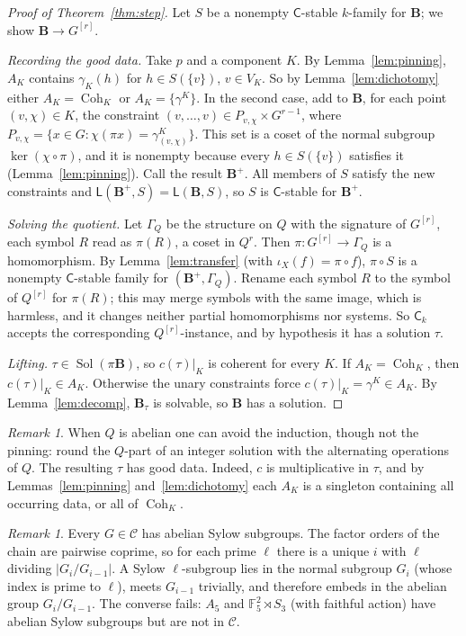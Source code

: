\documentclass[11pt]{article}
\theoremstyle{definition}
\theoremstyle{remark}
\newtheorem{remark}[theorem]{Remark}
\newcommand{\Coh}{\mathsf{C}}
\newcommand{\Sol}{\operatorname{Sol}}
\newcommand{\Cohset}{\operatorname{Coh}}
\begin{document}
\begin{proof}[Proof of Theorem~\ref{thm:step}]
Let $S$ be a nonempty $\Coh$-stable $k$-family for $\mathbf B$; we show
$\mathbf B\to G^{[r]}$.

\emph{Recording the good data.} Take $p$ and a component $K$. By
Lemma~\ref{lem:pinning}, $A_K$ contains $\gamma_K(h)$ for $h\in S(\{v\})$,
$v\in V_K$. So by Lemma~\ref{lem:dichotomy} either $A_K=\Cohset_K$ or
$A_K=\{\gamma^K\}$. In the second case, add to $\mathbf B$, for each point
$(v,\chi)\in K$, the constraint $(v,\dots,v)\in P_{v,\chi}\times G^{r-1}$,
where $P_{v,\chi}=\{x\in G:\chi(\pi x)=\gamma^K_{(v,\chi)}\}$. This set is a coset
of the normal subgroup $\ker(\chi\circ\pi)$, and it is nonempty because every
$h\in S(\{v\})$ satisfies it (Lemma~\ref{lem:pinning}). Call the result
$\mathbf B^+$. All members of $S$ satisfy the new constraints and
$\mathsf L(\mathbf B^+,S)=\mathsf L(\mathbf B,S)$, so $S$ is $\Coh$-stable for
$\mathbf B^+$.

\emph{Solving the quotient.} Let $\Gamma_Q$ be the structure on $Q$ with the
signature of $G^{[r]}$, each symbol $R$ read as $\pi(R)$, a coset in $Q^r$. Then
$\pi\colon G^{[r]}\to\Gamma_Q$ is a homomorphism. By Lemma~\ref{lem:transfer}
(with $\iota_X(f)=\pi\circ f$), $\pi\circ S$ is a nonempty $\Coh$-stable family
for $(\mathbf B^+,\Gamma_Q)$. Rename each symbol $R$ to the symbol of $Q^{[r]}$
for $\pi(R)$; this may merge symbols with the same image, which is harmless, and
it changes neither partial homomorphisms nor systems. So $\Coh_k$ accepts the
corresponding $Q^{[r]}$-instance, and by hypothesis it has a solution $\tau$.

\emph{Lifting.} $\tau\in\Sol(\pi\mathbf B)$, so $c(\tau)|_K$ is coherent for
every $K$. If $A_K=\Cohset_K$, then $c(\tau)|_K\in A_K$. Otherwise the unary
constraints force $c(\tau)|_K=\gamma^K\in A_K$. By Lemma~\ref{lem:decomp},
$\mathbf B_\tau$ is solvable, so $\mathbf B$ has a solution.
\end{proof}

\begin{remark}
When $Q$ is abelian one can avoid the induction, though not the pinning: round
the $Q$-part of an integer solution with the alternating operations of $Q$. The
resulting $\tau$ has good data. Indeed, $c$ is multiplicative in $\tau$, and by
Lemmas~\ref{lem:pinning} and~\ref{lem:dichotomy} each $A_K$ is a singleton
containing all occurring data, or all of $\Cohset_K$.
\end{remark}

\begin{remark}\label{rem:sylow}
Every $G\in\mathcal C$ has abelian Sylow subgroups. The factor orders of the
chain are pairwise coprime, so for each prime $\ell$ there is a unique $i$ with
$\ell$ dividing $|G_i/G_{i-1}|$. A Sylow $\ell$-subgroup lies in the normal
subgroup $G_i$ (whose index is prime to $\ell$), meets $G_{i-1}$ trivially, and
therefore embeds in the abelian group $G_i/G_{i-1}$. The converse fails: $A_5$
and $\mathbb F_5^2\rtimes S_3$ (with faithful action) have abelian Sylow subgroups
but are not in $\mathcal C$.
\end{remark}
\end{document}
